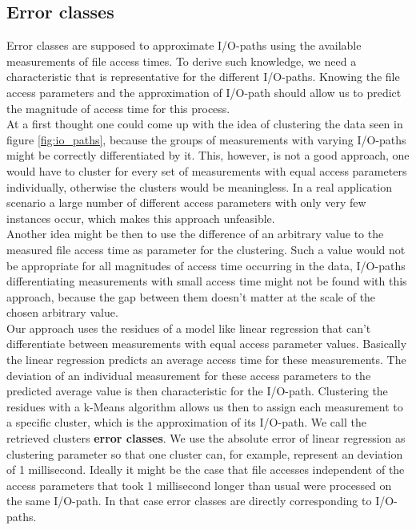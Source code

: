 \documentclass{superfri}
\begin{document}
\subsection{Error classes}
\label{sec:error_classes}
Error classes are supposed to approximate I/O-paths using the available measurements of file access times.
To derive such knowledge, we need a characteristic that is representative for the different I/O-paths. Knowing the file access parameters and the approximation of I/O-path should allow us to predict the magnitude of access time for this process.\\
At a first thought one could come up with the idea of clustering the data seen in figure \ref{fig:io_paths}, because the groups of measurements with varying I/O-paths might be correctly differentiated by it. 
This, however, is not a good approach, one would have to cluster for every set of measurements with equal access parameters individually, otherwise the clusters would be meaningless. In a real application scenario a large number of different access parameters with only very few instances occur, which makes this approach unfeasible.\\
Another idea might be then to use the difference of an arbitrary value to the measured file access time as parameter for the clustering. 
Such a value would not be appropriate for all magnitudes of access time occurring in the data, I/O-paths differentiating measurements with small access time might not be found with this approach, because the gap between them doesn't matter at the scale of the chosen arbitrary value.\\
Our approach uses the residues of a model like linear regression that can't differentiate between measurements with equal access parameter values.
Basically the linear regression predicts an average access time for these measurements.
The deviation of an individual measurement for these access parameters to the predicted average value is then characteristic for the I/O-path.
Clustering the residues with a k-Means algorithm allows us then to assign each measurement to a specific cluster, which is the approximation of its I/O-path.
We call the retrieved clusters \textbf{error classes}.
We use the absolute error of linear regression as clustering parameter so that one cluster can, for example, represent an deviation of 1 millisecond.
Ideally it might be the case that file accesses independent of the access parameters that took 1 millisecond longer than usual were processed on the same I/O-path.
In that case error classes are directly corresponding to I/O-paths. \medskip
\end{document}
